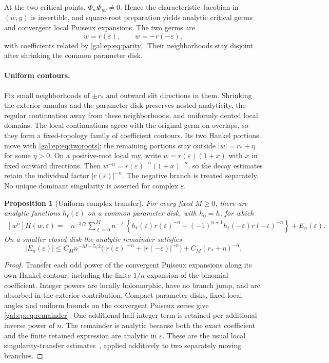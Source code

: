\documentclass[11pt,letterpaper]{article}
\numberwithin{equation}{section}
\newtheorem{proposition}[theorem]{Proposition}
\theoremstyle{definition}\newtheorem{definition}[theorem]{Definition}
\theoremstyle{remark}\newtheorem{remark}[theorem]{Remark}
\newcommand{\eps}{\varepsilon}
\newcommand{\coef}[1]{\left[#1\right]}
\begin{document}
At the two critical points, $\Phi_w\Phi_{yy}\ne0$. Hence the characteristic Jacobian in $(w,y)$ is invertible, and square-root preparation yields analytic critical germs and convergent local Puiseux expansions. The two germs are
\begin{equation}\label{gal:ep:eq:tworoots}
w=r(\eps),\qquad w=-r(-\eps),
\end{equation}
with coefficients related by \eqref{gal:ep:eq:parity}. Their neighborhoods stay disjoint after shrinking the common parameter disk.

\paragraph{Uniform contours.}
Fix small neighborhoods of $\pm r_*$ and outward slit directions in them. Shrinking the exterior annulus and the parameter disk preserves nested analyticity, the regular continuation away from these neighborhoods, and uniformly dented local domains. The local continuations agree with the original germ on overlaps, so they form a fixed-topology family of coefficient contours. Its two Hankel portions move with \eqref{gal:ep:eq:tworoots}; the remaining portions stay outside $|w|=r_*+\eta$ for some $\eta>0$. On a positive-root local ray, write $w=r(\eps)(1+x)$ with $x$ in fixed outward directions. Then $w^{-n}=r(\eps)^{-n}(1+x)^{-n}$, so the decay estimates retain the individual factor $|r(\eps)|^{-n}$. The negative branch is treated separately. No unique dominant singularity is asserted for complex $\eps$.

\begin{proposition}[Uniform complex transfer]\label{gal:ep:prop:transfer}
For every fixed $M\ge0$, there are analytic functions $h_\ell(\eps)$ on a common parameter disk, with $h_0=h$, for which
\begin{align}\label{gal:ep:eq:transfer}
\coef{w^n}H(w,\eps)
={}&n^{-3/2}\sum_{\ell=0}^M n^{-\ell}
\left\{h_\ell(\eps)r(\eps)^{-n}
 +(-1)^{n+1}h_\ell(-\eps)r(-\eps)^{-n}\right\}
 +E_n(\eps).
\end{align}
On a smaller closed disk the analytic remainder satisfies
\begin{equation}\label{gal:ep:eq:remainder}
|E_n(\eps)|\le C_M n^{-M-5/2}
\bigl(|r(\eps)|^{-n}+|r(-\eps)|^{-n}\bigr)
+C_M(r_*+\eta)^{-n}.
\end{equation}
\end{proposition}
\begin{proof}
Transfer each odd power of the convergent Puiseux expansions along its own Hankel contour, including the finite $1/n$ expansion of the binomial coefficient. Integer powers are locally holomorphic, have no branch jump, and are absorbed in the exterior contribution. Compact parameter disks, fixed local angles and uniform bounds on the convergent Puiseux series give \eqref{gal:ep:eq:remainder}. One additional half-integer term is retained per additional inverse power of $n$. The remainder is analytic because both the exact coefficient and the finite retained expression are analytic in $\eps$. These are the usual local singularity-transfer estimates~\cite{FS}, applied additively to two separately moving branches.
\end{proof}
\end{document}
